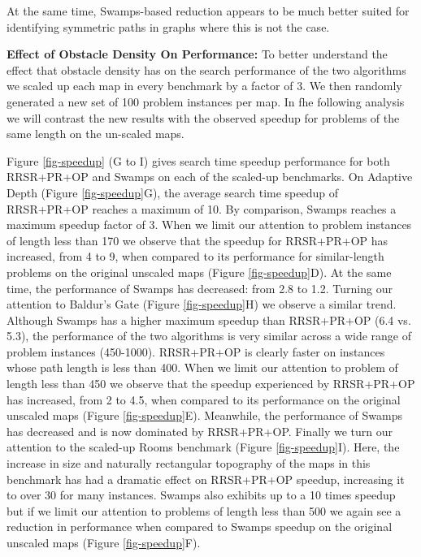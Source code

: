 At the same time, Swamps-based reduction appears to be much better suited for identifying symmetric paths 
in graphs where this is not the case.
\par
\textbf{Effect of Obstacle Density On Performance:}
To better understand the effect that obstacle density has on the search performance of the two algorithms
we scaled up each map in every benchmark by a factor of 3.
We then randomly generated a new set of 100 problem instances per map.
In fhe following analysis we will contrast the new
results with the observed speedup for problems of the same length on the un-scaled maps.
\par
Figure \ref{fig-speedup} (G to I) gives search time speedup performance for both RRSR+PR+OP and Swamps
on each of the scaled-up benchmarks.
On Adaptive Depth (Figure \ref{fig-speedup}G), the average search time speedup of RRSR+PR+OP reaches a maximum of 10. 
By comparison, Swamps reaches a maximum speedup factor of 3.
When we limit our attention to problem instances of length less than 170 we observe that the speedup 
for RRSR+PR+OP has increased, from 4 to 9, when compared to its performance for similar-length problems on the original 
unscaled maps (Figure \ref{fig-speedup}D). 
At the same time, the performance of Swamps has decreased: from 2.8 to 1.2.
Turning our attention to Baldur's Gate (Figure \ref{fig-speedup}H) we observe a similar trend.
Although Swamps has a higher maximum speedup than RRSR+PR+OP (6.4 vs. 5.3), the performance of the two 
algorithms is very similar across a wide range of problem instances (450-1000).
RRSR+PR+OP is clearly faster on instances whose path length is less than 400.
When we limit our attention to problem of length less than 450 we observe that the speedup experienced by
RRSR+PR+OP has increased, from 2 to 4.5, when compared to its performance on the original unscaled maps
(Figure \ref{fig-speedup}E).
Meanwhile, the performance of Swamps has decreased and is now dominated by RRSR+PR+OP.
Finally we turn our attention to the scaled-up Rooms benchmark (Figure \ref{fig-speedup}I).
Here, the increase in size and naturally rectangular topography of the maps in this benchmark
has had a dramatic effect on RRSR+PR+OP speedup, increasing it to over 30 for many instances.
Swamps also exhibits up to a 10 times speedup but if we limit our attention to problems of
length less than 500 we again see a reduction in performance when compared to Swamps speedup
on the original unscaled maps (Figure \ref{fig-speedup}F). 
\par
